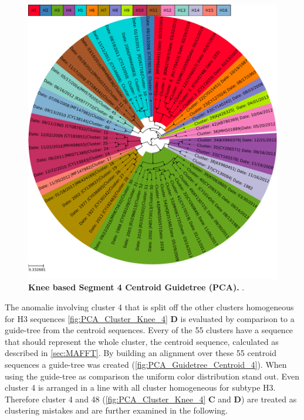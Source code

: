 \begin{figure}[!hbt]
    \centering
    \includegraphics[width=\textwidth]{PCA/Guidetree_segment_4_H_Centroid.pdf}
    \caption[Knee based Segment 4 Centroid Guidetree (\Acrshort{PCA})]{\textbf{Knee based Segment 4 Centroid Guidetree (\Acrshort{PCA}).} .}
    \label{fig:PCA_Guidetree_Centroid_4}
\end{figure}

The anomalie involving cluster 4 that is split off the other clusters homogeneous for H3 sequences \autoref{fig:PCA_Cluster_Knee_4} \textbf{\textsf{D}} is evaluated by comparison to a guide-tree from the centroid sequences. Every of the 55 clusters have a sequence that should represent the whole cluster, the centroid sequence, calculated as described in \autoref{sec:MAFFT}. By building an alignment over these 55 centroid sequences a guide-tree was created (\autoref{fig:PCA_Guidetree_Centroid_4}). When using the guide-tree as comparison the uniform color distribution stand out. Even cluster 4 is arranged in a line with all cluster homogeneous for subtype H3. Therefore cluster 4 and 48 (\autoref{fig:PCA_Cluster_Knee_4} \textbf{\textsf{C}} and \textbf{\textsf{D}}) are treated as clustering mistakes and are further examined in the following.

